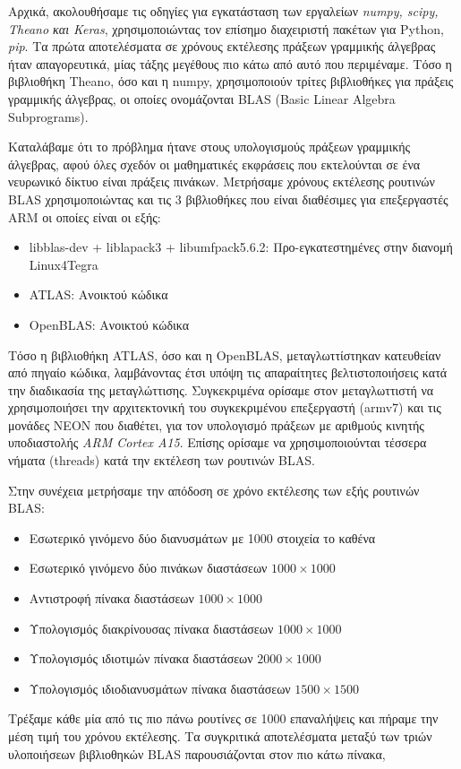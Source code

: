 Αρχικά, ακολουθήσαμε τις οδηγίες για εγκατάσταση των εργαλείων \emph{numpy, scipy, Theano και Keras},
χρησιμοποιώντας τον επίσημο διαχειριστή πακέτων για Python, \emph{pip}.
Τα πρώτα αποτελέσματα σε χρόνους εκτέλεσης πράξεων γραμμικής άλγεβρας ήταν
απαγορευτικά, μίας τάξης μεγέθους πιο κάτω από αυτό που περιμέναμε.
Τόσο η βιβλιοθήκη Theano, όσο και η numpy, χρησιμοποιούν τρίτες βιβλιοθήκες
για πράξεις γραμμικής άλγεβρας, οι οποίες ονομάζονται BLAS (Basic Linear Algebra Subprograms).

Καταλάβαμε ότι το πρόβλημα ήτανε στους υπολογισμούς πράξεων γραμμικής άλγεβρας,
αφού όλες σχεδόν οι μαθηματικές εκφράσεις που εκτελούνται σε ένα
νευρωνικό δίκτυο είναι πράξεις πινάκων. Μετρήσαμε χρόνους εκτέλεσης
ρουτινών BLAS χρησιμοποιώντας και τις 3 βιβλιοθήκες που είναι διαθέσιμες για
επεξεργαστές ARM οι οποίες είναι οι εξής:
\begin{itemize}
  \item{libblas-dev + liblapack3 + libumfpack5.6.2: Προ-εγκατεστημένες στην διανομή Linux4Tegra}
  \item{ATLAS: Ανοικτού κώδικα}
  \item{OpenBLAS: Ανοικτού κώδικα}
\end{itemize}

Τόσο η βιβλιοθήκη ATLAS, όσο και η OpenBLAS, μεταγλωττίστηκαν κατευθείαν από πηγαίο κώδικα,
λαμβάνοντας έτσι υπόψη τις απαραίτητες βελτιστοποιήσεις κατά την διαδικασία
της μεταγλώττισης. Συγκεκριμένα ορίσαμε στον μεταγλωττιστή να χρησιμοποιήσει την αρχιτεκτονική του
συγκεκριμένου επεξεργαστή (armv7) και τις μονάδες
NEON που διαθέτει, για τον υπολογισμό πράξεων με αριθμούς κινητής
υποδιαστολής \emph{ARM Cortex A15}. Επίσης ορίσαμε να χρησιμοποιούνται
τέσσερα νήματα (threads) κατά την εκτέλεση των ρουτινών BLAS.

Στην συνέχεια μετρήσαμε την απόδοση σε χρόνο εκτέλεσης των εξής ρουτινών BLAS:
\begin{itemize}
  \item{Εσωτερικό γινόμενο δύο διανυσμάτων με 1000 στοιχεία το καθένα}
  \item{Εσωτερικό γινόμενο δύο πινάκων διαστάσεων $1000 \times 1000$}
  \item{Αντιστροφή πίνακα διαστάσεων $1000 \times 1000$}
  \item{Υπολογισμός διακρίνουσας πίνακα διαστάσεων $1000 \times 1000$}
  \item{Υπολογισμός ιδιοτιμών πίνακα διαστάσεων $2000 \times 1000$}
  \item{Υπολογισμός ιδιοδιανυσμάτων πίνακα διαστάσεων $1500 \times 1500$}
\end{itemize}
Τρέξαμε κάθε μία από τις πιο πάνω ρουτίνες σε 1000 επαναλήψεις και πήραμε
την μέση τιμή του χρόνου εκτέλεσης.
Τα συγκριτικά αποτελέσματα μεταξύ των τριών υλοποιήσεων βιβλιοθηκών BLAS
παρουσιάζονται στον πιο κάτω πίνακα,
\\

